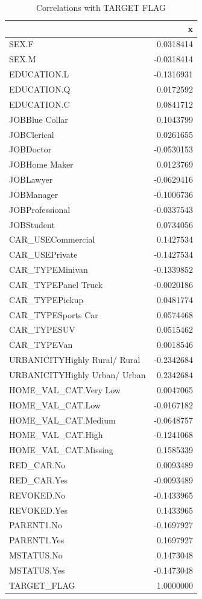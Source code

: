 \documentclass[
]{article}
\begin{document}
\begin{table}[H]
\centering\centering
\caption{\label{tab:cor matrix to remove columns}Correlations with TARGET FLAG}
\centering
\begin{tabular}[t]{l|r}
\hline
  & x\\
\hline
SEX.F & 0.0318414\\
\hline
SEX.M & -0.0318414\\
\hline
EDUCATION.L & -0.1316931\\
\hline
EDUCATION.Q & 0.0172592\\
\hline
EDUCATION.C & 0.0841712\\
\hline
JOBBlue Collar & 0.1043799\\
\hline
JOBClerical & 0.0261655\\
\hline
JOBDoctor & -0.0530153\\
\hline
JOBHome Maker & 0.0123769\\
\hline
JOBLawyer & -0.0629416\\
\hline
JOBManager & -0.1006736\\
\hline
JOBProfessional & -0.0337543\\
\hline
JOBStudent & 0.0734056\\
\hline
CAR\_USECommercial & 0.1427534\\
\hline
CAR\_USEPrivate & -0.1427534\\
\hline
CAR\_TYPEMinivan & -0.1339852\\
\hline
CAR\_TYPEPanel Truck & -0.0020186\\
\hline
CAR\_TYPEPickup & 0.0481774\\
\hline
CAR\_TYPESports Car & 0.0574468\\
\hline
CAR\_TYPESUV & 0.0515462\\
\hline
CAR\_TYPEVan & 0.0018546\\
\hline
URBANICITYHighly Rural/ Rural & -0.2342684\\
\hline
URBANICITYHighly Urban/ Urban & 0.2342684\\
\hline
HOME\_VAL\_CAT.Very Low & 0.0047065\\
\hline
HOME\_VAL\_CAT.Low & -0.0167182\\
\hline
HOME\_VAL\_CAT.Medium & -0.0648757\\
\hline
HOME\_VAL\_CAT.High & -0.1241068\\
\hline
HOME\_VAL\_CAT.Missing & 0.1585339\\
\hline
RED\_CAR.No & 0.0093489\\
\hline
RED\_CAR.Yes & -0.0093489\\
\hline
REVOKED.No & -0.1433965\\
\hline
REVOKED.Yes & 0.1433965\\
\hline
PARENT1.No & -0.1697927\\
\hline
PARENT1.Yes & 0.1697927\\
\hline
MSTATUS.No & 0.1473048\\
\hline
MSTATUS.Yes & -0.1473048\\
\hline
TARGET\_FLAG & 1.0000000\\
\hline
\end{tabular}
\end{table}
\end{document}
